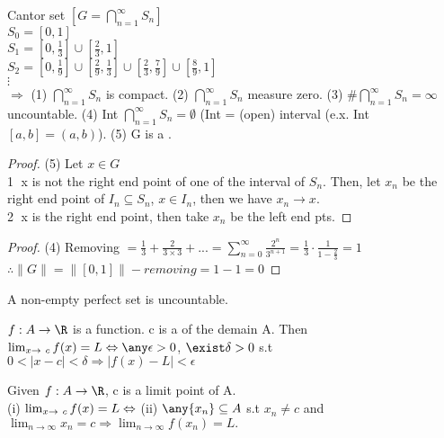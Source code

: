 \begin{definition}
\label{Cantor set}
    Cantor set $[ G = \bigcap\limits_{n=1}^\infty S_n]$ \\
    $S_0 = [0,1]$\\
    $S_1 = [0,\frac{1}{3}]\cup [\frac{2}{3},1]$\\
    $S_2 = [0, \frac{1}{9}] \cup [\frac{2}{9}, \frac{1}{3}]\cup [\frac{2}{3}, \frac{7}{9}]\cup[\frac{8}{9}, 1]$\\
    $\vdots$ \\
    $\Rightarrow$ (1)  $\bigcap\limits_{n=1}^\infty S_n$ is compact. (2) $\bigcap\limits_{n=1}^\infty S_n$ measure zero. (3) $\#\bigcap\limits_{n=1}^\infty S_n = \infty$ uncountable. (4) Int $\bigcap\limits_{n=1}^\infty S_n = \emptyset$ (Int = (open) interval (e.x. Int $[a,b] =(a,b)$). %
    (5) G is a .
\end{definition}
\begin{proof}
    (5) Let $x \in G$ \\
    \textcircled{1} x is not the right end point of one of the interval of $S_n$. Then, let $x_n$ be the right end point of $I_n \subseteq S_n$, $x \in I_n$, then we have $x_n \rightarrow x$. \\
    \textcircled{2} x is the right end point, then take $x_n$ be the left end pts.
\end{proof}
\begin{proof}
    (4) Removing $=\frac{1}{3} + \frac{2}{3 \times 3} + ... = \sum_{n=0}^\infty \frac{2^n}{3^{n+1}} = \frac{1}{3} \cdot \frac{1}{1-\frac{2}{3}} = 1$
    $\therefore \|G\| =\|[0,1]\| - removing = 1-1 =0$
\end{proof}
\begin{theorem}
    A non-empty perfect set is uncountable.
\end{theorem}
\begin{definition}
    $f:A\rightarrow \R$ is a function. c is a  of the demain A. Then $\lim_{x\to\ c} f(x) = L \Leftrightarrow \any \epsilon >0$, $\exist \delta >0$ s.t $0<|x-c|<\delta \Rightarrow |f(x)-L| < \epsilon$
\end{definition}
\begin{theorem}
\label{Sequential Criterion for Functional Limits}
    Given $f:A\rightarrow \R$, c is a limit point of A.\\
    (i) $\lim_{x\to\ c} f(x) = L\\ \Leftrightarrow$ 
    (ii) $\any \{x_n\} \subseteq A$ s.t $x_n \neq c$ and $\lim_{n\to\infty} x_n = c \Rightarrow \lim_{n\to\infty} f(x_n) = L.$
\end{theorem}
